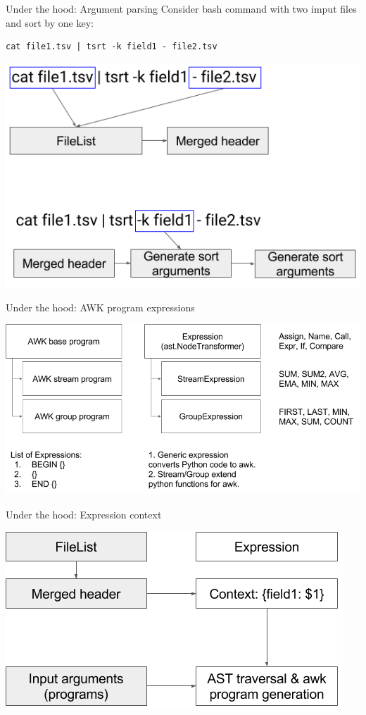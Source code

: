 \documentclass[unicode, notheorems, aspectratio=169]{beamer}
\begin{document}
\begin{frame}[fragile]{Under the hood: Argument parsing}
Consider bash command with two imput files and sort by one key:
\begin{verbatim}
cat file1.tsv | tsrt -k field1 - file2.tsv
\end{verbatim}
\vfill
\begin{center}
	\includegraphics[height=.7\textheight]{./images/argument-parsing}
\end{center}
\end{frame}

\begin{frame}{Under the hood: AWK program expressions}
\begin{center}
	\includegraphics[width=.9\textwidth]{./images/awk-program-expressions}
\end{center}
\end{frame}

\begin{frame}{Under the hood: Expression context}
\begin{center}
	\includegraphics[width=.7\textwidth]{./images/expression-context}
\end{center}
\end{frame}
\end{document}

